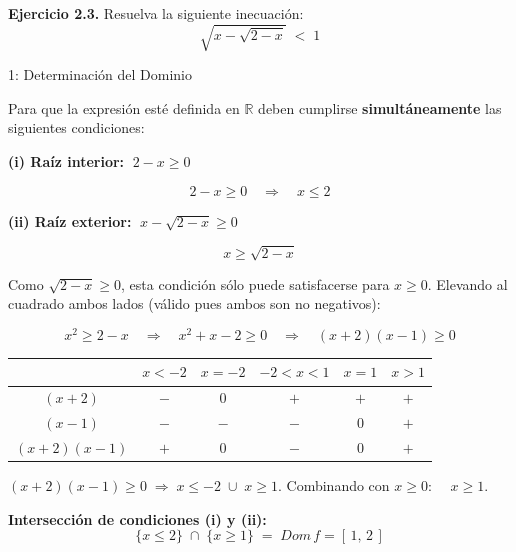\documentclass[letterpaper, 12pt]{article}
\begin{document}
\begin{tcolorbox}[colback=azulFuerte!12, colframe=azulFuerte, arc=8pt,
    boxrule=1.2pt, enhanced]
    \textbf{\large Ejercicio 2.3.} \quad Resuelva la siguiente inecuación:
    \[
        \sqrt{x - \sqrt{2-x}} \;<\; 1
    \]
\end{tcolorbox}

\bigskip

\begin{paso}{1: Determinación del Dominio}

Para que la expresión esté definida en $\mathbb{R}$ deben cumplirse
\textbf{simultáneamente} las siguientes condiciones:

\medskip
\textbf{(i) Raíz interior:} $\;2 - x \geq 0$

\[
    2 - x \geq 0 \quad\Longrightarrow\quad x \leq 2
\]

\textbf{(ii) Raíz exterior:} $\;x - \sqrt{2-x} \geq 0$

\[
    x \geq \sqrt{2-x}
\]

Como $\sqrt{2-x} \geq 0$, esta condición sólo puede satisfacerse para $x \geq 0$.
Elevando al cuadrado ambos lados (válido pues ambos son no negativos):

\[
    x^{2} \geq 2 - x \quad\Longrightarrow\quad
    x^{2} + x - 2 \geq 0 \quad\Longrightarrow\quad
    (x+2)(x-1) \geq 0
\]

\begin{center}
\renewcommand{\arraystretch}{1.4}
\begin{tabular}{c|ccccc}
    & $x < -2$ & $x=-2$ & $-2 < x < 1$ & $x=1$ & $x > 1$ \\
\hline
$(x+2)$ & $-$ & $0$ & $+$ & $+$ & $+$ \\
$(x-1)$ & $-$ & $-$ & $-$ & $0$ & $+$ \\
\hline
$(x+2)(x-1)$ & $+$ & $0$ & $-$ & $0$ & $+$ \\
\end{tabular}
\end{center}

\medskip
$(x+2)(x-1) \geq 0 \;\Rightarrow\; x \leq -2 \;\cup\; x \geq 1$.
Combinando con $x \geq 0$: $\quad x \geq 1$.

\bigskip
\textbf{Intersección de condiciones (i) y (ii):}
\[
    \{x \leq 2\} \;\cap\; \{x \geq 1\} \;=\; \boxed{Dom\,f = [\,1,\,2\,]}
\]

\end{paso}
\end{document}
